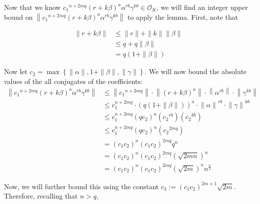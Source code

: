 \documentclass[a4paper, 11pt]{book}
\begin{document}
{Now that we know ${c_1}^{n+2mq}{(r+k\beta)}^{a}{\alpha}^{rb}\gamma^{kb} \in \mathcal{O}_K$, we will find an integer upper bound on $\left\| {c_1}^{n+2mq}{(r+k\beta)}^{a}{\alpha}^{rb}\gamma^{kb} \right\|$ to apply the lemma. First, note that 

\begin{align*}
    \| r + k\beta \| &\leq \| r \| + \| k \| \| \beta \| \\
                     &\leq q + q \| \beta \| \\
                     &= q\left(1 + \| \beta \|\right)
\end{align*}

Now let $c_2 = \max\left\{\| \alpha \|, 1 + \|\beta\|, \| \gamma \|\right\}$. We will now bound the absolute values of the all conjugates of the coefficients: 
\begin{align*}
    \left\|{c_1}^{n+2mq}{(r+k\beta)}^{a}{\alpha}^{rb}\gamma^{kb}\right\| &\leq \left\| {c_1}^{n+2mq} \right\| \cdot \left\| {(r + k\beta)}^{a} \right\| \cdot \left\| {\alpha}^{rb} \right\| \cdot \left\| {\gamma}^{kb} \right\| \\
                                                              &\leq c_1^{n+2mq} \cdot {\left(q\left(1 + \| \beta \|\right)\right)}^{a} \cdot {\| \alpha \|}^{rb} \cdot {\| \gamma \|}^{kb} \\
                                                              &\leq c_1^{n+2mq} {\left({qc_2}\right)}^{a} \left({c_2}^{rb}\right) \left({c_2}^{kb}\right) \\
                                                              &\leq c_1^{n+2mq} {\left({qc_2}\right)}^{n} \left({c_2}^{2mq}\right) \\
                                                              &= {\left(c_{1}c_{2}\right)}^{n} {\left(c_{1}c_{2}\right)}^{2mq}q^{n} \\
                                                              &=  {\left(c_{1}c_{2}\right)}^{n} {\left(c_{1}c_{2}\right)}^{2mq}{\left(\sqrt{2mn}\right)}^{n} \\
                                                              &= {\left(c_{1}c_{2}\right)}^{n} {\left(c_{1}c_{2}\right)}^{2mq}{\left(\sqrt{2m}\right)}^{n}n^{\frac{n}{2}}
\end{align*}

Now, we will further bound this using the constant $c_3 := {\left(c_{1}c_{2}\right)}^{2m+1}\sqrt{2m}$. Therefore, recalling that $n > q$, 

}
\end{document}
